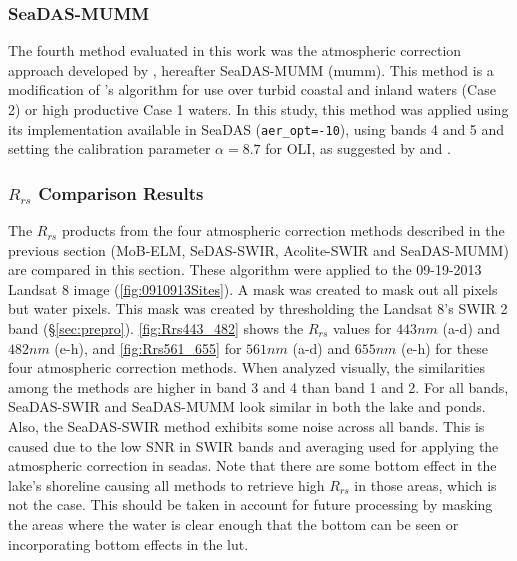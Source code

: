 \subsubsection{SeaDAS-MUMM}
The fourth method evaluated in this work was the atmospheric correction approach developed by \citet{Ruddick:2000bs}, hereafter SeaDAS-MUMM (\acrfull{mumm}). This method is a modification of \citet{Gordon:1994}'s algorithm for use over turbid coastal and inland waters (Case 2) or high productive Case 1 waters. In this study, this method was applied using its implementation available in SeaDAS ({\tt aer\_opt=-10}), using bands 4 and 5 and setting the calibration parameter $\alpha=8.7$ for OLI, as suggested by \citet{Vanhellemont2014} and \citet{Vanhellemont2014a}. 

\subsubsection{\texorpdfstring{$R_{rs}$}{Rrs} Comparison Results}

The $R_{rs}$ products from the four atmospheric correction methods described in the previous section (MoB-ELM, SeDAS-SWIR, Acolite-SWIR and SeaDAS-MUMM) are compared in this section. These algorithm were applied to the 09-19-2013 Landsat 8 image (\autoref{fig:0910913Sites}). A mask was created to mask out all pixels but water pixels. This mask was created by thresholding the Landsat 8's SWIR 2 band (\S\ref{sec:prepro}). \autoref{fig:Rrs443_482} shows the $R_{rs}$ values for $443nm$ (a-d) and $482nm$ (e-h), and \autoref{fig:Rrs561_655} for $561nm$ (a-d) and $655nm$ (e-h) for these four atmospheric correction methods. When analyzed visually, the similarities among the methods are higher in band 3 and 4 than band 1 and 2. For all bands, SeaDAS-SWIR and SeaDAS-MUMM look similar in both the lake and ponds. Also, the SeaDAS-SWIR method exhibits some noise across all bands. This is caused due to the low SNR in SWIR bands and averaging used for applying the \citet{Gordon:1994} atmospheric correction in \gls{seadas}.  Note that there are some bottom effect in the lake's shoreline causing all methods to retrieve high $R_{rs}$ in those areas, which is not the case. This should be taken in account for future processing by masking the areas where the water is clear enough that the bottom can be seen or incorporating bottom effects in the \gls{lut}.

